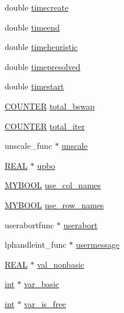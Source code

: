 \begin{DoxyCompactItemize}
\item 
double \hyperlink{struct__lprec_a32ec9852d05f8eaf319f785a17b40d03}{timecreate}
\item 
double \hyperlink{struct__lprec_aecd73cf7ad94751d4205f69c16b7e401}{timeend}
\item 
double \hyperlink{struct__lprec_a96e8630b093e93b97375ff39ecd7ec7d}{timeheuristic}
\item 
double \hyperlink{struct__lprec_ac65cb528d091ea86bae6c595fe13b886}{timepresolved}
\item 
double \hyperlink{struct__lprec_a40887966c55a8ad26f4583da37d296aa}{timestart}
\item 
\hyperlink{lp__lib_8h_ae16918a3a5096d4f1f039965f44dc2ec}{C\+O\+U\+N\+T\+ER} \hyperlink{struct__lprec_a978e67f3f550b18acc6cc560ae7d7dda}{total\+\_\+bswap}
\item 
\hyperlink{lp__lib_8h_ae16918a3a5096d4f1f039965f44dc2ec}{C\+O\+U\+N\+T\+ER} \hyperlink{struct__lprec_af9a80ebb3a2339e191a1bc6568f94dad}{total\+\_\+iter}
\item 
unscale\+\_\+func $\ast$ \hyperlink{struct__lprec_a104c67b459bd104dd106e54222b08c9d}{unscale}
\item 
\hyperlink{lp__lib_8h_a92bd5e363d131fa73669358edb232dce}{R\+E\+AL} $\ast$ \hyperlink{struct__lprec_a95b957248728a93e5ddd724213a13c3b}{upbo}
\item 
\hyperlink{lp__lib_8h_aad848328fb3018217ac9f01d97b6bd88}{M\+Y\+B\+O\+OL} \hyperlink{struct__lprec_ac8f7cbd735ac6d67d49780485d1f8f33}{use\+\_\+col\+\_\+names}
\item 
\hyperlink{lp__lib_8h_aad848328fb3018217ac9f01d97b6bd88}{M\+Y\+B\+O\+OL} \hyperlink{struct__lprec_a7409756855000caec27629dda7d0690a}{use\+\_\+row\+\_\+names}
\item 
userabortfunc $\ast$ \hyperlink{struct__lprec_a9ad901dbaf1073010e99b0e400127096}{userabort}
\item 
lphandleint\+\_\+func $\ast$ \hyperlink{struct__lprec_a008c171a59c434419f9bfa86536810ec}{usermessage}
\item 
\hyperlink{lp__lib_8h_a92bd5e363d131fa73669358edb232dce}{R\+E\+AL} $\ast$ \hyperlink{struct__lprec_ac833bc75add6b241d6eedd68d242b9cf}{val\+\_\+nonbasic}
\item 
\hyperlink{lp__lib_8h_adeb9ec6400320e4923ac9d836d509ddb}{int} $\ast$ \hyperlink{struct__lprec_aaaed179854dbfd29f3b28b1b18837c33}{var\+\_\+basic}
\item 
\hyperlink{lp__lib_8h_adeb9ec6400320e4923ac9d836d509ddb}{int} $\ast$ \hyperlink{struct__lprec_ad3c0f8de4cfa97ea3504770eac89cf35}{var\+\_\+is\+\_\+free}

\end{DoxyCompactItemize}
